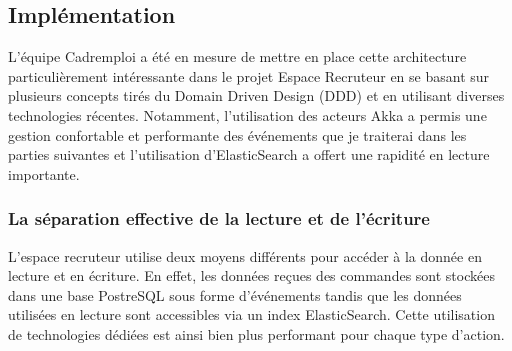 \subsection{Implémentation}
\label{sub:Implémentation}
L'équipe Cadremploi a été en mesure de mettre en place cette architecture particulièrement intéressante dans le projet Espace Recruteur en se basant sur plusieurs concepts tirés du Domain Driven Design (DDD) et en utilisant diverses technologies récentes.
Notamment, l'utilisation des acteurs Akka a permis une gestion confortable et performante des événements que je traiterai dans les parties suivantes et l'utilisation d'ElasticSearch a offert une rapidité en lecture importante.

\subsubsection{La séparation effective de la lecture et de l'écriture}
\label{subs:La séparation effective de la lecture et de l'écriture}
L'espace recruteur utilise deux moyens différents pour accéder à la donnée en lecture et en écriture.
En effet, les données reçues des commandes sont stockées dans une base PostreSQL sous forme d'événements tandis que les données utilisées en lecture sont accessibles via un index ElasticSearch.
Cette utilisation de technologies dédiées est ainsi bien plus performant pour chaque type d'action.
